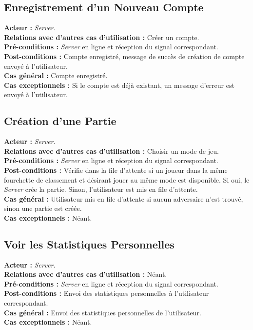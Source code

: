 \documentclass[10pt, a4paper]{article}
\begin{document}
\subsection{Enregistrement d'un Nouveau Compte}
\textbf{Acteur :} \textit{Server}. \\
\textbf{Relations avec d'autres cas d'utilisation :} Créer un compte. \\
\textbf{Pré-conditions :} \textit{Server} en ligne et réception du signal correspondant. \\
\textbf{Post-conditions :} Compte enregistré, message de succès de création de compte envoyé à l'utilisateur. \\
\textbf{Cas général :} Compte enregistré. \\
\textbf{Cas exceptionnels :} Si le compte est déjà existant, un message d'erreur est envoyé à l'utilisateur. \\

\subsection{Création d'une Partie}
\textbf{Acteur :} \textit{Server}. \\
\textbf{Relations avec d'autres cas d'utilisation :} Choisir un mode de jeu. \\
\textbf{Pré-conditions :} \textit{Server} en ligne et réception du signal correspondant. \\
\textbf{Post-conditions :} Vérifie dans la file d'attente si un joueur dans la même fourchette de classement et désirant jouer au même mode est disponible. Si oui, le \textit{Server} crée la partie. Sinon, l'utilisateur est mis en file d'attente. \\
\textbf{Cas général :} Utilisateur mis en file d'attente si aucun adversaire n'est trouvé, sinon une partie est créée. \\
\textbf{Cas exceptionnels :} Néant. \\

\subsection{Voir les Statistiques Personnelles}
\textbf{Acteur :} \textit{Server}. \\
\textbf{Relations avec d'autres cas d'utilisation :} Néant. \\
\textbf{Pré-conditions :} \textit{Server} en ligne et réception du signal correspondant. \\
\textbf{Post-conditions :} Envoi des statistiques personnelles à l'utilisateur correspondant. \\
\textbf{Cas général :} Envoi des statistiques personnelles de l'utilisateur. \\
\textbf{Cas exceptionnels :} Néant. \\
\end{document}
